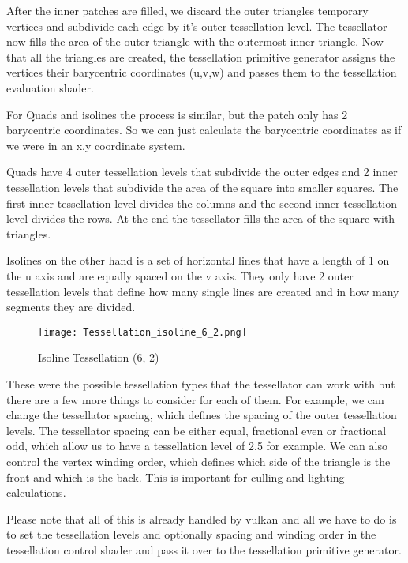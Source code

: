 \documentclass[12pt]{report} \usepackage{preamble}
\begin{document}
After the inner patches are filled, we discard the outer triangles temporary vertices
and subdivide each edge by it's outer tessellation level.
The tessellator now fills the area of the outer triangle with the outermost inner triangle.
Now that all the triangles are created, the tessellation primitive generator assigns
the vertices their barycentric coordinates (u,v,w)
and passes them to the tessellation evaluation shader. \cite{tessellation}

For Quads and isolines the process is similar, but the patch only has 2 barycentric coordinates.
So we can just calculate the barycentric coordinates as if we were in
an x,y coordinate system. \cite{tessellation}

Quads have 4 outer tessellation levels that subdivide the outer edges
and 2 inner tessellation levels that subdivide the area of the square
into smaller squares. The first inner tessellation level divides the columns
and the second inner tessellation level divides the rows.
At the end the tessellator fills the area of the square with triangles. \cite{tessellation}

Isolines on the other hand is a set of horizontal lines that have a length
of 1 on the u axis and are equally spaced on the v axis.
They only have 2 outer tessellation levels that define how many single lines
are created and in how many segments they are divided.

\begin{figure}[hbtp]
	\centering \texttt{[image: Tessellation\_isoline\_6\_2.png]}
	\caption{Isoline Tessellation (6, 2)}
	\cite{fig:isoline}
\end{figure} \FloatBarrier

These were the possible tessellation types that the tessellator
can work with but there are a few more things to consider for each of them.
For example, we can change the tessellator spacing,
which defines the spacing of the outer tessellation levels.
The tessellator spacing can be either equal, fractional even or fractional odd,
which allow us to have a tessellation level of 2.5 for example. \cite{tessellation}
We can also control the vertex winding order, which defines which side of the triangle
is the front and which is the back. This is important
for culling and lighting calculations. \cite{tessellation}

Please note that all of this is already handled by vulkan
and all we have to do is to set the tessellation levels and optionally spacing
and winding order in the tessellation control shader and pass it over
to the tessellation primitive generator. \cite{tessellation}
\end{document}
